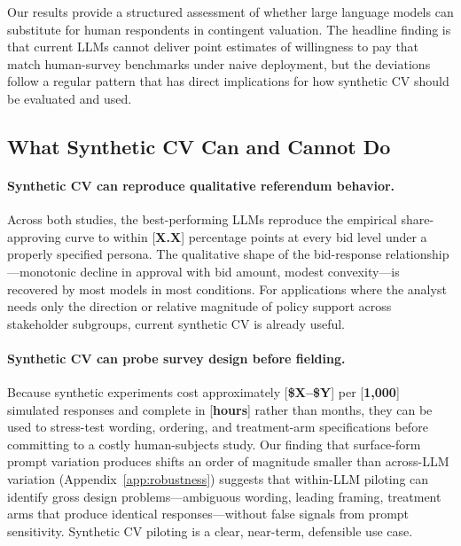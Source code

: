 \documentclass[12pt]{article}
\begin{document}
Our results provide a structured assessment of whether large language
models can substitute for human respondents in contingent valuation. The
headline finding is that current LLMs cannot deliver point estimates of
willingness to pay that match human-survey benchmarks under naive
deployment, but the deviations follow a regular pattern that has direct
implications for how synthetic CV should be evaluated and used.

\subsection{What Synthetic CV Can and Cannot Do}\label{sec:disc-can-cant}

\paragraph{Synthetic CV can reproduce qualitative referendum behavior.}
Across both studies, the best-performing LLMs reproduce the empirical
share-approving curve to within [\textbf{X.X}] percentage points at every
bid level under a properly specified persona. The qualitative shape of
the bid-response relationship---monotonic decline in approval with bid
amount, modest convexity---is recovered by most models in most
conditions. For applications where the analyst needs only the direction
or relative magnitude of policy support across stakeholder subgroups,
current synthetic CV is already useful.

\paragraph{Synthetic CV can probe survey design before fielding.} Because
synthetic experiments cost approximately [\textbf{\$X--\$Y}] per
[\textbf{1{,}000}] simulated responses and complete in [\textbf{hours}]
rather than months, they can be used to stress-test wording, ordering,
and treatment-arm specifications before committing to a costly
human-subjects study. Our finding that surface-form prompt variation
produces shifts an order of magnitude smaller than across-LLM variation
(Appendix~\ref{app:robustness}) suggests that within-LLM piloting can
identify gross design problems---ambiguous wording, leading framing,
treatment arms that produce identical responses---without false signals
from prompt sensitivity. Synthetic CV piloting is a clear, near-term,
defensible use case.
\end{document}
